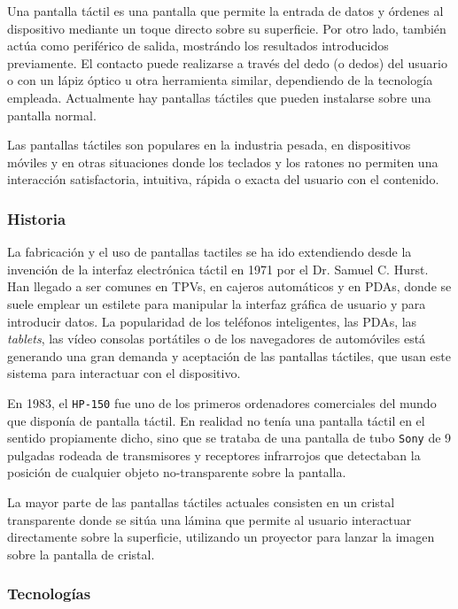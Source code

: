 Una pantalla táctil es una pantalla que permite la entrada de datos y órdenes 
al dispositivo mediante un toque directo sobre su superficie. Por otro lado, 
también actúa como periférico de salida, mostrándo los resultados introducidos 
previamente. El contacto puede realizarse a través del dedo (o dedos) del
usuario o con un lápiz óptico u otra herramienta similar, dependiendo de la 
tecnología empleada. Actualmente hay pantallas táctiles que pueden instalarse 
sobre una pantalla normal.

Las pantallas táctiles son populares en la industria pesada, en dispositivos
móviles y en otras situaciones donde los teclados y los ratones no permiten una 
interacción satisfactoria, intuitiva, rápida o exacta del usuario con el 
contenido.

  \subsubsection{Historia}
La fabricación y el uso de pantallas tactiles se ha ido extendiendo desde la 
invención de la interfaz electrónica táctil en 1971 por el Dr. Samuel C. Hurst. 
Han llegado a ser comunes en \acs{TPV}s, en cajeros automáticos y en
\acs{PDA}s, donde se suele emplear un estilete para manipular la interfaz 
gráfica de usuario y para introducir datos. La popularidad de los teléfonos 
inteligentes, las \acs{PDA}s, las \emph{tablets}, las vídeo consolas portátiles 
o de los navegadores de automóviles está generando una gran demanda y 
aceptación de las pantallas táctiles, que usan este sistema para interactuar
con el dispositivo.

En 1983, el \texttt{HP-150} fue uno de los primeros ordenadores comerciales del 
mundo que disponía de pantalla táctil. En realidad no tenía una pantalla táctil 
en el sentido propiamente dicho, sino que se trataba de una pantalla de tubo 
\texttt{Sony} de 9 pulgadas rodeada de transmisores y receptores infrarrojos 
que detectaban la posición de cualquier objeto no-transparente sobre la 
pantalla.

La mayor parte de las pantallas táctiles actuales consisten en un cristal 
transparente donde se sitúa una lámina que permite al usuario interactuar 
directamente sobre la superficie, utilizando un proyector para lanzar la 
imagen sobre la pantalla de cristal.

  \subsubsection{Tecnologías}

